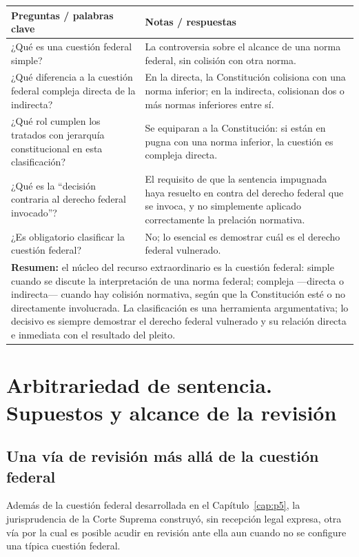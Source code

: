 \documentclass[12pt,oneside]{book}
\begin{document}
\begin{longtable}{@{}p{}p{}@{}}
\toprule
\textbf{Preguntas / palabras clave} & \textbf{Notas / respuestas} \\
\midrule
\endhead
¿Qué es una cuestión federal simple? & La controversia sobre el alcance de una
norma federal, sin colisión con otra norma. \\
¿Qué diferencia a la cuestión federal compleja directa de la indirecta? & En la
directa, la Constitución colisiona con una norma inferior; en la indirecta,
colisionan dos o más normas inferiores entre sí. \\
¿Qué rol cumplen los tratados con jerarquía constitucional en esta clasificación?
& Se equiparan a la Constitución: si están en pugna con una norma inferior, la
cuestión es compleja directa. \\
¿Qué es la ``decisión contraria al derecho federal invocado''? & El requisito de
que la sentencia impugnada haya resuelto en contra del derecho federal que se
invoca, y no simplemente aplicado correctamente la prelación normativa. \\
¿Es obligatorio clasificar la cuestión federal? & No; lo esencial es demostrar
cuál es el derecho federal vulnerado. \\
\midrule
\multicolumn{2}{p{0.95\textwidth}}{\textbf{Resumen:} el núcleo del recurso
extraordinario es la cuestión federal: simple cuando se discute la
interpretación de una norma federal; compleja —directa o indirecta— cuando hay
colisión normativa, según que la Constitución esté o no directamente involucrada.
La clasificación es una herramienta argumentativa; lo decisivo es siempre
demostrar el derecho federal vulnerado y su relación directa e inmediata con el
resultado del pleito.} \\
\bottomrule
\end{longtable}


\chapter{Arbitrariedad de sentencia. Supuestos y alcance de la revisión}
\label{cap:p6}

\section{Una vía de revisión más allá de la cuestión federal}

Además de la cuestión federal desarrollada en el Capítulo~\ref{cap:p5}, la
jurisprudencia de la Corte Suprema construyó, sin recepción legal expresa, otra vía
por la cual es posible acudir en revisión ante ella aun cuando no se configure una
típica cuestión federal.
\end{document}
